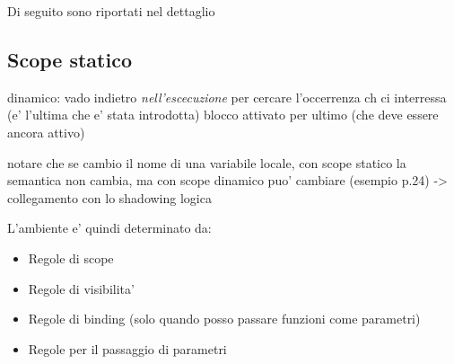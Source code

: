 Di seguito sono riportati nel dettaglio

\subsection{Scope statico}

dinamico: 
vado indietro \textit{nell'escecuzione} per cercare l'occerrenza ch ci interressa (e' l'ultima che e' stata introdotta) blocco attivato per ultimo (che deve essere ancora attivo)

notare che se cambio il nome di una variabile locale, con scope statico la semantica non cambia, ma con scope dinamico puo' cambiare (esempio p.24) -> collegamento con lo shadowing logica

L'ambiente e' quindi determinato da:
\begin{itemize}
\item Regole di scope
\item Regole di visibilita'
\item Regole di binding (solo quando posso passare funzioni come parametri)
\item Regole per il passaggio di parametri
\end{itemize}

% 
